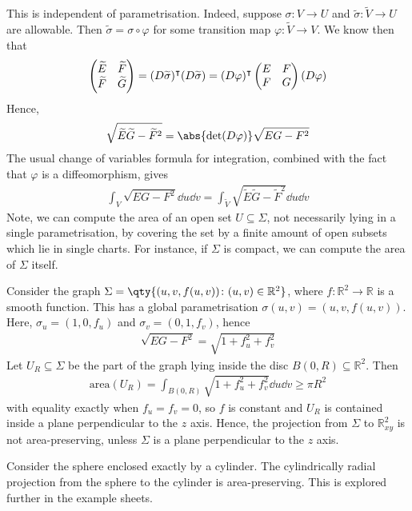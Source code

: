 \begin{remark}
	This is independent of parametrisation.
	Indeed, suppose $\sigma \colon V \to U$ and $\widetilde \sigma \colon \widetilde V \to U$ are allowable.
	Then $\widetilde \sigma = \sigma \circ \varphi$ for some transition map $\varphi \colon \widetilde V \to V$.
	We know then that
	\begin{align*}
		\begin{pmatrix}
			\widetilde E & \widetilde F \\
			\widetilde F & \widetilde G
		\end{pmatrix} = (D\widetilde \sigma)^\intercal (D\widetilde \sigma) = (D\varphi)^\intercal \begin{pmatrix}
			E & F \\
			F & G
		\end{pmatrix} (D\varphi)
	\end{align*}
	Hence,
	\begin{align*}
		\sqrt{\widetilde E \widetilde G - \widetilde F^2} = \abs{\det(D\varphi)} \sqrt{EG - F^2}
	\end{align*}
	The usual change of variables formula for integration, combined with the fact that $\varphi$ is a diffeomorphism, gives
	\begin{align*}
		\int_V \sqrt{EG - F^2} \dd{u}\dd{v} = \int_{\widetilde V} \sqrt{\widetilde E \widetilde G - \widetilde F^2} \dd{u}\dd{v}
	\end{align*}
	Note, we can compute the area of an open set $U \subseteq \Sigma$, not necessarily lying in a single parametrisation, by covering the set by a finite amount of open subsets which lie in single charts.
	For instance, if $\Sigma$ is compact, we can compute the area of $\Sigma$ itself.
\end{remark}
\begin{example}
	Consider the graph $\Sigma = \qty{(u,v,f(u,v)) \colon (u,v) \in \mathbb R^2}$, where $f \colon \mathbb R^2 \to \mathbb R$ is a smooth function.
	This has a global parametrisation $\sigma(u,v) = (u,v,f(u,v))$.
	Here, $\sigma_u = (1,0,f_u)$ and $\sigma_v = (0,1,f_v)$, hence
	\begin{align*}
		\sqrt{EG - F^2} = \sqrt{1+f_u^2+f_v^2}
	\end{align*}
	Let $U_R \subseteq \Sigma$ be the part of the graph lying inside the disc $B(0,R) \subseteq \mathbb R^2$.
	Then
	\begin{align*}
		\mathrm{area}(U_R) = \int_{B(0,R)} \sqrt{1+f_u^2+f_v^2} \dd{u}\dd{v} \geq \pi R^2
	\end{align*}
	with equality exactly when $f_u = f_v = 0$, so $f$ is constant and $U_R$ is contained inside a plane perpendicular to the $z$ axis.
	Hence, the projection from $\Sigma$ to $\mathbb R^2_{xy}$ is not area-preserving, unless $\Sigma$ is a plane perpendicular to the $z$ axis.
\end{example}
\begin{example}
	Consider the sphere enclosed exactly by a cylinder.
	The cylindrically radial projection from the sphere to the cylinder is area-preserving.
	This is explored further in the example sheets.
\end{example}

